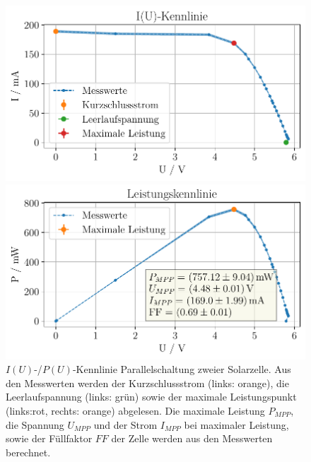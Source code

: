 \documentclass[english, ngerman]{scrartcl}
\newcommand{\FF}{\ensuremath{\mathit{FF}}}
\begin{document}
\setcaphanging
%
\setcapindent{0pt}
\begin{figure}[H]
    \centering
    \begin{minipage}[t]{0.485\linewidth}
        \centering
        \includegraphics[width=\linewidth]{fig/plots/solar_parallel_UI_.pdf}
    \end{minipage}%
    \hspace*{\fill}
    \begin{minipage}[t]{0.485\linewidth}
        \centering
        \includegraphics[width=\linewidth]{fig/plots/solar_parallel_UP_.pdf}
    \end{minipage}
    \caption[$I(U)$-/$P(U)$-Kennlinie Parallelschaltung Solarzelle]{$I(U)$-/$P(U)$-Kennlinie Parallelschaltung zweier Solarzelle. Aus den Messwerten werden der Kurzschlussstrom (links: orange), die Leerlaufspannung (links: grün) sowie der maximale Leistungspunkt (links:rot, rechts: orange) abgelesen. Die maximale Leistung $P_{MPP}$, die Spannung $U_{MPP}$ und der Strom $I_{MPP}$ bei maximaler Leistung, sowie der Füllfaktor $\FF$ der Zelle werden aus den Messwerten berechnet.}
    \label{fig:solar_parallel}
\end{figure}
\end{document}
